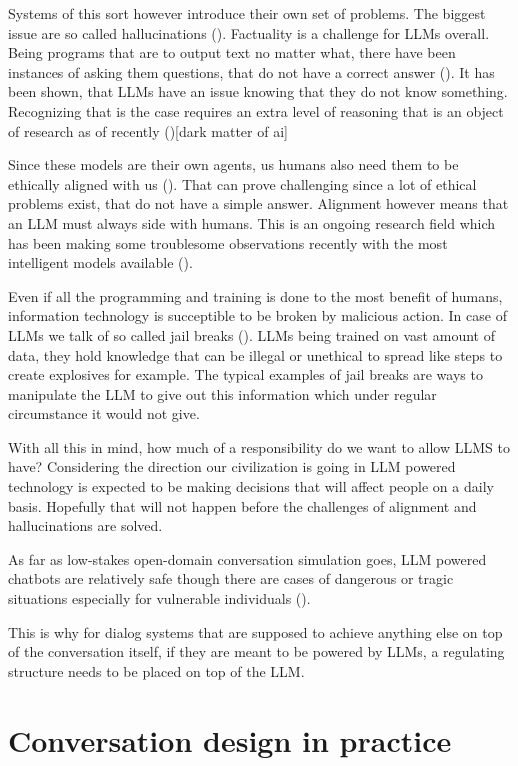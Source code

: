 \documentclass[12pt]{report}
\begin{document}
{Systems of this sort however introduce their own set of problems.
The biggest issue are so called hallucinations ().
Factuality is a challenge for LLMs overall.
Being programs that are to output text no matter what,
there have been instances of asking them questions,
that do not have a correct answer ().
It has been shown, that LLMs have an issue
knowing that they do not know something.
Recognizing that is the case requires
an extra level of reasoning
that is an object of research as of recently ()[dark matter of ai]

Since these models are their own agents,
us humans also need them to be ethically aligned with us ().
That can prove challenging since a lot of ethical problems exist,
that do not have a simple answer.
Alignment however means that an LLM must always side with humans.
This is an ongoing research field which has been making some
troublesome observations recently with the most intelligent models available ().

Even if all the programming and training is done to the most benefit of humans,
information technology is succeptible to be broken by malicious action.
In case of LLMs we talk of so called jail breaks ().
LLMs being trained on vast amount of data,
they hold knowledge that can be illegal or unethical to spread
like steps to create explosives for example.
The typical examples of jail breaks are ways to manipulate
the LLM to give out this information
which under regular circumstance it would not give.

With all this in mind,
how much of a responsibility do we want to allow LLMS to have?
Considering the direction our civilization is going in
LLM powered technology is expected to be making decisions
that will affect people on a daily basis.
Hopefully that will not happen before
the challenges of alignment and hallucinations
are solved.

As far as low-stakes open-domain conversation simulation goes,
LLM powered chatbots are relatively safe
though there are cases of dangerous or tragic situations
especially for vulnerable individuals ().

This is why for dialog systems that are supposed to achieve
anything else on top of the conversation itself,
if they are meant to be powered by LLMs,
a regulating structure needs to be placed on top of the LLM.

\section{Conversation design in practice}

}
\end{document}
